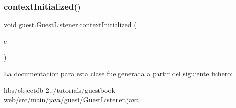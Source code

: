 \subsubsection{\texorpdfstring{contextInitialized()}{contextInitialized()}}
{\footnotesize\ttfamily void guest.\+Guest\+Listener.\+context\+Initialized (\begin{DoxyParamCaption}\item[{Servlet\+Context\+Event}]{e }\end{DoxyParamCaption})}



La documentación para esta clase fue generada a partir del siguiente fichero\+:\begin{DoxyCompactItemize}
\item 
libs/objectdb-\/2../tutorials/guestbook-\/web/src/main/java/guest/\mbox{\hyperlink{_guest_listener_8java}{Guest\+Listener.\+java}}\end{DoxyCompactItemize}
